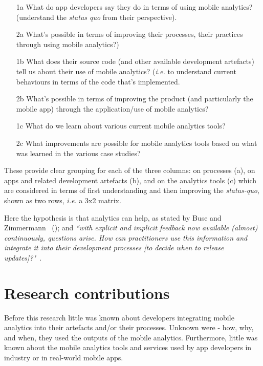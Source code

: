 \begin{enumerate}
    \item [1a] What do app developers say they do in terms of using mobile analytics? (understand the \emph{status quo} from their perspective).
    \item [2a] What's possible in terms of improving their processes, their practices through using mobile analytics?)
    \item [1b] What does their source code (and other available development artefacts) tell us about their use of mobile analytics? (\emph{i.e.} to understand current behaviours in terms of the code that's implemented.
    \item [2b] What's possible in terms of improving the product (and particularly the mobile app) through the application/use of mobile analytics?
    \item [1c] What do we learn about various current mobile analytics tools?
    \item [2c] What improvements are possible for mobile analytics tools based on what was learned in the various case studies?
\end{enumerate}

These provide clear grouping for each of the three columns: on processes (a), on apps and related development artefacts (b), and on the analytics tools (c) which are considered in terms of first understanding and then improving the \emph{status-quo}, shown as two rows, \emph{i.e.} a 3x2 matrix. 


Here the hypothesis is that analytics can help, as stated by Buse and Zimmermann ~(\citeyear{buse_analytics_2010}); and \emph{``with explicit and implicit feedback now available (almost) continuously, questions arise. How can practitioners use this information and integrate it into their development processes [to decide when to release updates]?"}~.


\section{Research contributions}
Before this research little was known about developers integrating mobile analytics into their artefacts and/or their processes. Unknown were - how, why, and when, they used the outputs of the mobile analytics. Furthermore, little was known about the mobile analytics tools and services used by app developers in industry or in real-world mobile apps.

